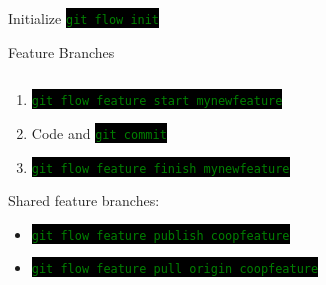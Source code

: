 \documentclass[
14pt,
aspectratio=169,
usenames,
dvipsnames,
x11names]{beamer}
\newcommand{\code}[1]{{\small\colorbox{black}{\textcolor{green}{\texttt{#1}}}}}
\begin{document}
\begin{frame}[fragile]{Initialize}
  \centering
  \code{git flow init}
\end{frame}

\begin{frame}{Feature Branches}
  \begin{columns}
    \begin{column}{.7\linewidth}
      \minipage[c][0.75\textheight][s]{\columnwidth}
      \begin{enumerate} \setlength{\itemsep}{\fill}
      \item \code{git flow feature start mynewfeature}
      \item Code and \code{git commit}
      \item \code{git flow feature finish  mynewfeature}
      \end{enumerate}
      \vfill
      Shared feature branches:
      \begin{itemize} \setlength{\itemsep}{\fill}
      \item \code{git flow feature publish coopfeature}
      \item \code{git flow feature pull origin coopfeature}
      \end{itemize}
      \endminipage
    \end{column}
    \begin{column}{.3\linewidth}
      \centering

\end{column}
\end{columns}
\end{frame}
\end{document}

